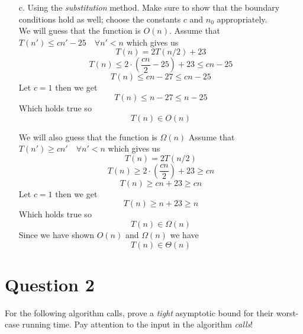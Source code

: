 \documentclass{article}
\begin{document}
\begin{itemize}
\item [c.] Using the \emph{substitution} method. Make sure to show that the boundary conditions hold as well; choose the constants $c$ and $n_0$ appropriately. \\
We will guess that the function is $O(n)$.
Assume that $T(n') \leq cn'- 25 \quad \forall n' < n$ which gives us
$$ T(n) = 2T(n/2) + 23 $$
$$ T(n) \leq 2\cdot (\frac{cn}{2} - 25) + 23 \leq cn -25$$
$$ T(n) \leq cn - 27 \leq cn - 25 $$
Let $ c = 1$ then we get
$$ T(n) \leq n - 27 \leq n - 25 $$
Which holds true so
$$ T(n) \in O(n) $$

We will also guess that the function is $\Omega (n)$
Assume that $T(n') \geq cn'\quad \forall n' < n$ which gives us
$$ T(n) = 2T(n/2) $$
$$ T(n) \geq 2\cdot (\frac{cn}{2}) + 23 \geq cn $$
$$ T(n) \geq cn + 23 \geq cn $$
Let $ c = 1$ then we get
$$ T(n) \geq n + 23 \geq n $$
Which holds true so
$$ T(n) \in \Omega(n) $$
Since we have shown $O(n)$ and $\Omega(n)$ we have
$$ T(n) \in \Theta(n)$$
\end{itemize}

\section*{Question 2}

For the following algorithm calls, prove a {\em tight} asymptotic bound for their worst-case running time. Pay attention to the input in the algorithm \emph{calls}! \\
\end{document}
